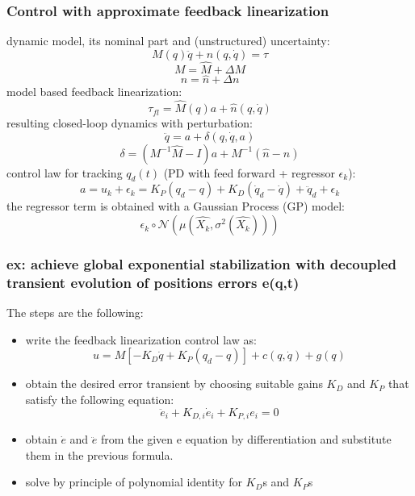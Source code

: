 \documentclass[a4paper,12pt]{article}
\begin{document}
\subsubsection{Control with approximate feedback linearization}
dynamic model, its nominal part and (unstructured) uncertainty:
\begin{equation}
    M(q)\ddot{q} + n(q,\dot{q}) = \tau 
\end{equation}
\begin{equation}
    M = \hat{M} + \Delta M 
\end{equation}
\begin{equation}
    n = \hat{n} + \Delta n
\end{equation}
model based feedback linearization:
\begin{equation}
    \tau_{fl} = \hat{M}(q)a + \hat{n}(q,\dot{q}) 
\end{equation}
resulting closed-loop dynamics with perturbation:
\begin{equation}
\ddot{q}=a + \delta(q,\dot{q},a)
\end{equation}
\begin{equation}
    \delta = (M^{-1}\hat{M}-I)a + M^{-1}(\hat{n}-n)
    \end{equation}
control law for tracking $q_d(t)$ (PD with feed forward + regressor $\epsilon_k$):
\begin{equation}
    a= u_k + \epsilon_k = K_P(q_d-q) + K_D(\dot{q}_d-\dot{q}) + \ddot{q}_d + \epsilon_k
\end{equation}
the regressor term is obtained with a Gaussian Process (GP) model:
\begin{equation}
    \epsilon_k \circ \mathcal{N}(\mu(\hat{X_k},\sigma^2(\hat{X_k})))
\end{equation}
\subsubsection{ex: achieve global exponential stabilization with 
decoupled transient evolution of positions errors e(q,t)}
The steps are the following:
\begin{itemize}
\item write the feedback linearization control law as: \begin{equation}
u=M[-K_D\dot{q}+K_P(q_d-q)]+c(q,\dot{q})+g(q)
\end{equation}
\item obtain the desired error transient by choosing suitable gains 
$K_D$ and $K_P$ that satisfy the following equation: \begin{equation}
    \ddot{e}_i+K_{D,i}\dot{e}_i+K_{P,i}e_i=0
\end{equation}
\item obtain $\dot{e}$ and $\ddot{e}$ from the given e equation by differentiation 
and substitute them in the previous formula.
\item solve by principle of polynomial identity for $K_D$s and $K_P$s
\end{itemize}
\end{document}
